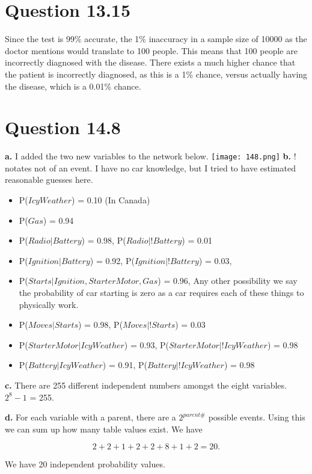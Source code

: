 \documentclass[12pt]{amsart}
\begin{document}
\section*{Question 13.15}
Since the test is 99\% accurate, the 1\% inaccuracy in a sample size of 10000 as the doctor mentions would translate to 100 people. This means that 100 people are incorrectly diagnosed with the disease.  There exists a much higher chance that the patient is incorrectly diagnosed, as this is a 1\% chance, versus actually having the disease, which is a 0.01\% chance. 

\section*{Question 14.8}
\textbf{a.} I added the two new variables to the network below.
  \hfill \break
 \texttt{[image: 148.png]} 
\hfill \break
 \textbf{b.}  
 ! notates not of an event. I have no car knowledge, but I tried to have estimated reasonable guesses here.
 \begin{itemize}
 \item P($IcyWeather$) = 0.10 (In Canada)
  \item P($Gas$) = 0.94 
  \item P($Radio | Battery$) = 0.98, P($Radio | ! Battery$) = 0.01
  \item P($Ignition | Battery$) = 0.92, P($Ignition | !Battery$) = 0.03,
  \item P($Starts | Ignition, Starter Motor, Gas$) = 0.96, Any other possibility we say the probability of car starting is zero as a car requires each of these things to physically work.
 \item P($Moves | Starts$) = 0.98, P($Moves | !Starts$) = 0.03
 \item P($Starter Motor | IcyWeather$) = 0.93, P($Starter Motor | !IcyWeather$) = 0.98
  \item P($Battery | IcyWeather$) = 0.91,  P($Battery | !IcyWeather$) = 0.98
\end{itemize}

\hfill \break

\textbf{c.} There are 255 different independent numbers amongst the eight variables. $2^8 -1$ = 255.

  \hfill \break
  
\textbf{d.} For each variable with a parent, there are a $2^{parent \#}$ possible events. Using this we can sum up how many table values exist. We have

\begin{equation*} 
2 + 2 + 1 + 2 + 2 + 8 + 1 + 2 = 20.
\end{equation*}

We have 20 independent probability values.

  \hfill \break
\end{document}

